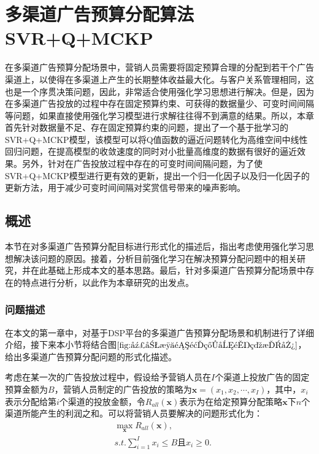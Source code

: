 
\chapter{多渠道广告预算分配算法SVR+Q+MCKP}

在多渠道广告预算分配场景中，营销人员需要将固定预算合理的分配到若干个广告渠道上，以使得在多渠道上产生的长期整体收益最大化。与客户关系管理相同，这也是一个序贯决策问题，因此，非常适合使用强化学习思想进行解决。但是，因为在多渠道广告投放的过程中存在固定预算约束、可获得的数据量少、可变时间间隔等问题，如果直接使用强化学习模型进行求解往往得不到满意的结果。所以，本章首先针对数据量不足、存在固定预算约束的问题，提出了一个基于批学习的SVR+Q+MCKP模型，该模型可以将Q值函数的逼近问题转化为高维空间中线性回归问题，在提高模型的收敛速度的同时对小批量高维度的数据有很好的逼近效果。另外，针对在广告投放过程中存在的可变时间间隔问题，为了使SVR+Q+MCKP模型进行更有效的更新，提出一个归一化因子以及归一化因子的更新方法，用于减少可变时间间隔对奖赏信号带来的噪声影响。

\section{概述}
本节在对多渠道广告预算分配目标进行形式化的描述后，指出考虑使用强化学习思想解决该问题的原因。接着，分析目前强化学习在解决预算分配问题中的相关研究，并在此基础上形成本文的基本思路。最后，针对多渠道广告预算分配场景中存在的特点进行分析，以此作为本章研究的出发点。

\subsection{问题描述}
在本文的第一章中，对基于DSP平台的多渠道广告预算分配场景和机制进行了详细介绍，接下来本小节将结合图$\ref{fig:广告渠道预算分配示意图}$，给出多渠道广告预算分配问题的形式化描述。

考虑在某一次的广告投放过程中，假设给予营销人员在$I$个渠道上投放广告的固定预算金额为$B$，营销人员制定的广告投放的策略为$\bm{x}=(x_{1},x_{2},\cdots,x_{I})$，其中，$x_{i}$表示分配给第$i$个渠道的投放金额，令$R_{all}(\bm{x})$表示为在给定预算分配策略$\bm{x}$下$n$个渠道所能产生的利润之和。可以将营销人员要解决的问题形式化为：
\begin{equation}\label{seq_ad_goal}
\begin{split}
&\max_{\bm{x}} R_{all}(\bm{x}),\\
&s.t. \sum_{i=1}^{I} x_{i} \leqslant B \text{且} x_{i} \geq 0.
\end{split}
\end{equation}

